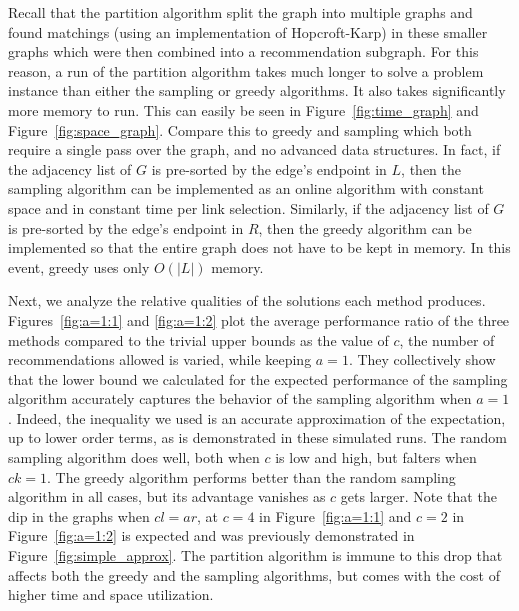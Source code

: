 Recall that the partition algorithm split the graph into multiple graphs
and found matchings (using an implementation of Hopcroft-Karp) 
in these smaller graphs which were then combined into
a recommendation subgraph. For this reason, a run of the partition
algorithm takes much longer to solve a problem instance than either the
sampling or greedy algorithms. It also takes significantly more memory to
run. This can easily be seen in Figure~\ref{fig:time_graph} and Figure~\ref{fig:space_graph}.
Compare this to greedy and sampling which both require a single pass over
the graph, and no advanced data structures. In fact, if the adjacency list
of $G$ is pre-sorted by the edge's endpoint in $L$, then the sampling algorithm can be
implemented as an online algorithm with constant space and in constant time 
per link selection. Similarly, if the adjacency list of $G$
is pre-sorted by the edge's endpoint in $R$, then the greedy algorithm can
be implemented so that the entire graph does not have to be kept in memory. In this
event, greedy uses only $O(|L|)$ memory.\vs

Next, we analyze the relative qualities of the solutions each method
produces.  Figures~\ref{fig:a=1:1} and \ref{fig:a=1:2} plot the
average performance ratio of the three methods compared to the trivial
upper bounds as the value of $c$, the number of recommendations
allowed is varied, while keeping $a = 1$.
They collectively show that the lower bound we calculated for the
expected performance of the sampling algorithm accurately captures the
behavior of the sampling algorithm when $a=1$. Indeed, the inequality
we used is an accurate approximation of the expectation, up to lower
order terms, as is demonstrated in these simulated runs.  The random
sampling algorithm does well, both when $c$ is low and high, but
falters when $ck=1$. The greedy algorithm performs better than the
random sampling algorithm in all cases, but its advantage vanishes as
$c$ gets larger. Note that the dip in the graphs when $cl=ar$, at
$c=4$ in Figure~\ref{fig:a=1:1} and $c=2$ in Figure~\ref{fig:a=1:2} is
expected and was previously demonstrated in
Figure~\ref{fig:simple_approx}.  The partition algorithm is immune to
this drop that affects both the greedy and the sampling algorithms,
but comes with the cost of higher time and space utilization.

